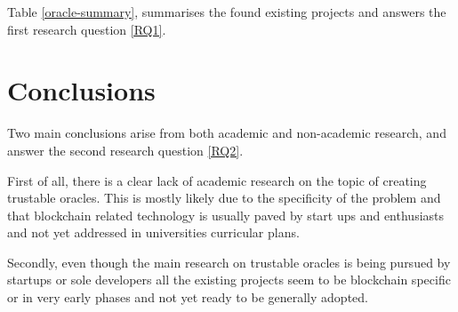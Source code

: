 Table \ref{oracle-summary}, summarises the found existing projects and answers the first research question \ref{RQ1}.


\begin{table}[]
  \centering
  \caption{Summary of oracle projects/research.}
  \label{oracle-summary}
\end{table}



\section{Conclusions}


Two main conclusions arise from both academic and non-academic research, and answer the second research question \ref{RQ2}.

First of all, there is a clear lack of academic research on the topic of creating trustable oracles. This is mostly likely due to the specificity of the problem and that blockchain related technology is usually paved by start ups and enthusiasts and not yet addressed in universities curricular plans.

Secondly, even though the main research on trustable oracles is being pursued by startups or sole developers all the existing projects seem to be blockchain specific or in very early phases and not yet ready to be generally adopted.


